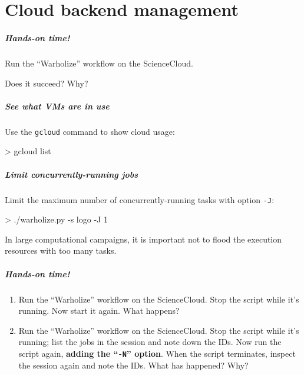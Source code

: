 \documentclass[english,serif,mathserif,usenames,dvipsnames]{beamer}
\begin{document}
\part{Cloud backend management}

\begin{frame}
  \frametitle{Hands-on time!}
  \begin{exercise}
    Run the ``Warholize'' workflow on the ScienceCloud.

    Does it succeed? Why?
  \end{exercise}
\end{frame}


\begin{frame}
  \frametitle{See what VMs are in use}

  Use the \texttt{gcloud} command to show cloud usage:
\begin{semiverbatim}
    > gcloud list
\end{semiverbatim}

\end{frame}


\begin{frame}
  \frametitle{Limit concurrently-running jobs}

  Limit the maximum number of concurrently-running tasks
  with option \texttt{-J}:
\begin{semiverbatim}
    > ./warholize.py -s logo -J 1
\end{semiverbatim}

  \+ In large computational campaigns, it is important not to flood the
  execution resources with too many tasks.
\end{frame}


\begin{frame}
  \frametitle{Hands-on time!}

    \begin{exercise}
      \begin{enumerate}
      \item Run the ``Warholize'' workflow on the ScienceCloud.  Stop
        the script while it's running.  Now start it again.  What
        happens?

      \item Run the ``Warholize'' workflow on the ScienceCloud.  Stop
        the script while it's running; list the jobs in the session
        and note down the IDs.  Now run the script again,
        \textbf{adding the ``\texttt{-N}'' option}.  When the script
        terminates, inspect the session again and note the IDs. What has
        happened? Why?
      \end{enumerate}
    \end{exercise}
\end{frame}
\end{document}
